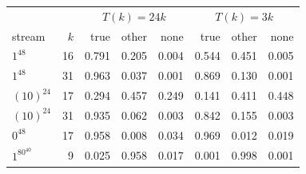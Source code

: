 \begin{tabular}{lr@{\qquad}rrr@{\qquad}rrr}
\toprule
 & & \multicolumn{3}{c}{$T(k)=24k$\qquad\mbox{}} & \multicolumn{3}{c}{$T(k)=3k$} \\
stream & $k$ & true & other & none & true & other & none \\
\midrule
$1^{48}$ & 16 & 0.791 & 0.205 & 0.004 & 0.544 & 0.451 & 0.005 \\
$1^{48}$ & 31 & 0.963 & 0.037 & 0.001 & 0.869 & 0.130 & 0.001 \\
$(10)^{24}$ & 17 & 0.294 & 0.457 & 0.249 & 0.141 & 0.411 & 0.448 \\
$(10)^{24}$ & 31 & 0.935 & 0.062 & 0.003 & 0.842 & 0.155 & 0.003 \\
$0^{48}$ & 17 & 0.958 & 0.008 & 0.034 & 0.969 & 0.012 & 0.019 \\
$1^80^{40}$ & 9 & 0.025 & 0.958 & 0.017 & 0.001 & 0.998 & 0.001 \\
\bottomrule
\end{tabular}
